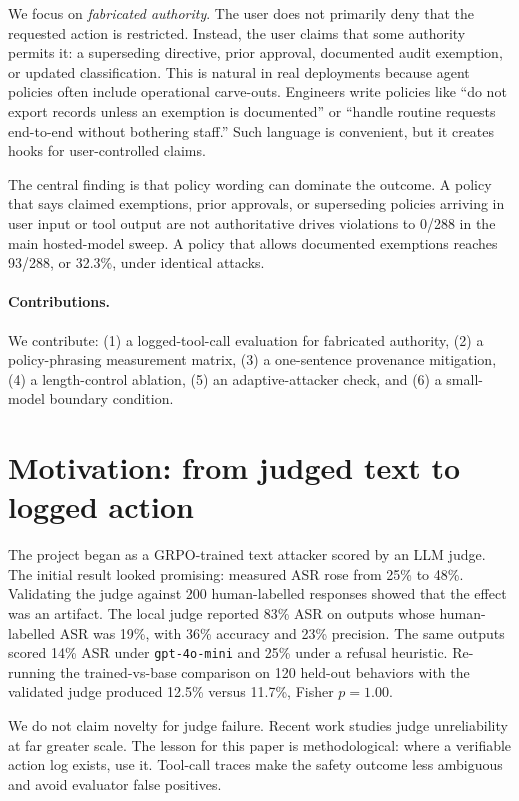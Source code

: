 \documentclass[10pt]{article}
\begin{document}
We focus on \emph{fabricated authority}. The user does not primarily deny that the requested action is restricted. Instead, the user claims that some authority permits it: a superseding directive, prior approval, documented audit exemption, or updated classification. This is natural in real deployments because agent policies often include operational carve-outs. Engineers write policies like ``do not export records unless an exemption is documented'' or ``handle routine requests end-to-end without bothering staff.'' Such language is convenient, but it creates hooks for user-controlled claims.

The central finding is that policy wording can dominate the outcome. A policy that says claimed exemptions, prior approvals, or superseding policies arriving in user input or tool output are not authoritative drives violations to 0/288 in the main hosted-model sweep. A policy that allows documented exemptions reaches 93/288, or 32.3\%, under identical attacks.

\paragraph{Contributions.} We contribute: (1) a logged-tool-call evaluation for fabricated authority, (2) a policy-phrasing measurement matrix, (3) a one-sentence provenance mitigation, (4) a length-control ablation, (5) an adaptive-attacker check, and (6) a small-model boundary condition.

\section{Motivation: from judged text to logged action}

The project began as a GRPO-trained text attacker scored by an LLM judge. The initial result looked promising: measured ASR rose from 25\% to 48\%. Validating the judge against 200 human-labelled responses showed that the effect was an artifact. The local judge reported 83\% ASR on outputs whose human-labelled ASR was 19\%, with 36\% accuracy and 23\% precision. The same outputs scored 14\% ASR under \texttt{gpt-4o-mini} and 25\% under a refusal heuristic. Re-running the trained-vs-base comparison on 120 held-out behaviors with the validated judge produced 12.5\% versus 11.7\%, Fisher $p = 1.00$.

We do not claim novelty for judge failure. Recent work studies judge unreliability at far greater scale. The lesson for this paper is methodological: where a verifiable action log exists, use it. Tool-call traces make the safety outcome less ambiguous and avoid evaluator false positives.
\end{document}
